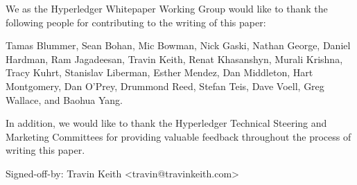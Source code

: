 We as the Hyperledger Whitepaper Working Group would like to thank the following people for contributing to the writing of this paper:

Tamas Blummer, Sean Bohan, Mic Bowman, Nick Gaski, Nathan George, Daniel Hardman, Ram Jagadeesan, Travin Keith, Renat Khasanshyn, Murali Krishna, Tracy Kuhrt, Stanislav Liberman, Esther Mendez, Dan Middleton, Hart Montgomery, Dan O'Prey, Drummond Reed, Stefan Teis, Dave Voell, Greg Wallace, and Baohua Yang.

In addition, we would like to thank the Hyperledger Technical Steering and Marketing Committees for providing valuable feedback throughout the process of writing this paper.

Signed-off-by: Travin Keith <travin@travinkeith.com>
